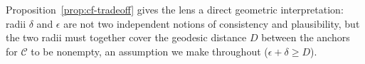 Proposition~\ref{prop:cf-tradeoff} gives the lens a direct geometric interpretation:
radii $\delta$ and $\epsilon$ are not two independent notions of \textcolor{frappe_red}{consistency} and plausibility, but the two radii must together cover the geodesic distance $D$ between the anchors for $\mathcal C$ to be nonempty, an assumption we make throughout ($\epsilon+\delta\ge D$).

